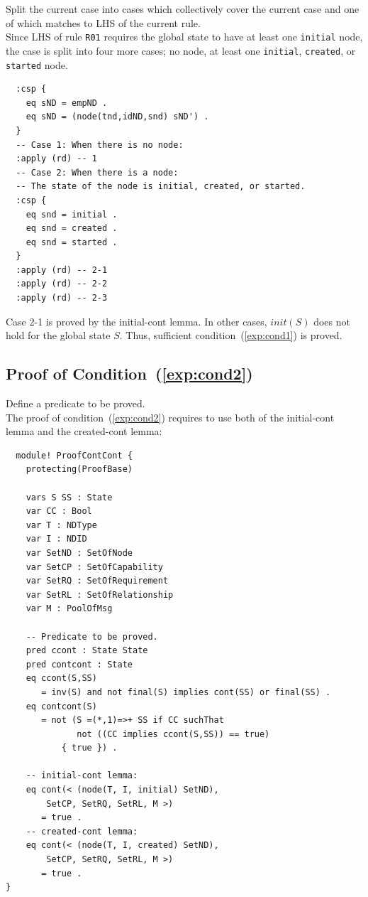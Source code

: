 \documentclass[12pt]{report}
\begin{document}
 Split the current case into cases which
collectively cover the current case and one of which matches to LHS of
the current rule. \\
Since LHS of rule {\tt R01} requires the global state to have at least
one {\tt initial} node, the case is split into four more cases; no
node, at least one {\tt initial}, {\tt created}, or {\tt started}
node.
\small
\begin{verbatim}
  :csp { 
    eq sND = empND .
    eq sND = (node(tnd,idND,snd) sND') .
  }
  -- Case 1: When there is no node:
  :apply (rd) -- 1
  -- Case 2: When there is a node:
  -- The state of the node is initial, created, or started.
  :csp { 
    eq snd = initial .
    eq snd = created .
    eq snd = started .
  }
  :apply (rd) -- 2-1
  :apply (rd) -- 2-2
  :apply (rd) -- 2-3
\end{verbatim}
\normalsize
Case 2-1 is proved by the initial-cont lemma. In other cases,
$init(S)$ does not hold for the global state $S$. Thus, sufficient
condition~(\ref{exp:cond1}) is proved.

\subsection{Proof of Condition~(\ref{exp:cond2})}
\label{sec:TOSCAcontcont}
 Define a predicate to be proved. \\ 
The proof of condition~(\ref{exp:cond2}) requires to use both of the
initial-cont lemma and the created-cont lemma:
\small
\begin{verbatim}
  module! ProofContCont {
    protecting(ProofBase)
  
    vars S SS : State
    var CC : Bool
    var T : NDType
    var I : NDID
    var SetND : SetOfNode
    var SetCP : SetOfCapability
    var SetRQ : SetOfRequirement
    var SetRL : SetOfRelationship
    var M : PoolOfMsg
  
    -- Predicate to be proved.
    pred ccont : State State
    pred contcont : State
    eq ccont(S,SS)
       = inv(S) and not final(S) implies cont(SS) or final(SS) .
    eq contcont(S)
       = not (S =(*,1)=>+ SS if CC suchThat
              not ((CC implies ccont(S,SS)) == true)
           { true }) .
  
    -- initial-cont lemma: 
    eq cont(< (node(T, I, initial) SetND), 
  	    SetCP, SetRQ, SetRL, M >)
       = true .
    -- created-cont lemma:
    eq cont(< (node(T, I, created) SetND), 
  	    SetCP, SetRQ, SetRL, M >)
       = true .
}
\end{verbatim}
\normalsize
\end{document}
